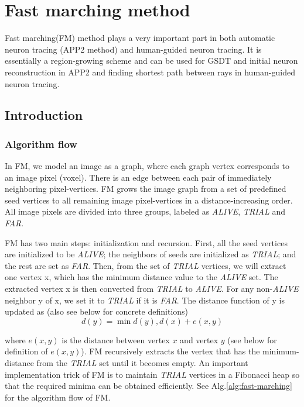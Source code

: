 \chapter{Fast marching method} \label{chpt:fm}
Fast marching(FM) method \cite{sethian1999level} plays a very important part in both automatic neuron tracing (APP2 method) and human-guided neuron tracing. It is essentially a region-growing scheme and can be used for GSDT and initial neuron reconstruction in APP2 and finding shortest path between rays in human-guided neuron tracing.
\section{Introduction}
\subsection{Algorithm flow}
In FM, we model an image as a graph, where each graph vertex corresponds to an image pixel (voxel). There is an edge between each pair of immediately neighboring pixel-vertices. FM grows the image graph from a set of predefined seed vertices to all remaining image pixel-vertices in a distance-increasing order.  All image pixels are divided into three groups, labeled as \emph{ALIVE}, \emph{TRIAL} and \emph{FAR}. 

FM has two main steps: initialization and recursion. First, all the seed vertices are initialized to be \emph{ALIVE}; the neighbors of seeds are initialized as \emph{TRIAL}; and the rest are set as \emph{FAR}. Then, from the set of \emph{TRIAL} vertices, we will extract one vertex x, which has the minimum distance value to the \emph{ALIVE} set. The extracted vertex x is then converted from \emph{TRIAL} to \emph{ALIVE}.  For any non-\emph{ALIVE} neighbor y of x, we set it to \emph{TRIAL} if it is \emph{FAR}. The distance function of y is updated as (also see below for concrete definitions)
\begin{equation}
d(y)=\min⁡{d(y),d(x)+e(x,y)}
\end{equation}

where $e(x,y)$ is the distance between vertex $x$ and vertex $y$ (see below for definition of $e(x,y)$). FM recursively extracts the vertex that has the minimum-distance from the \emph{TRIAL} set until it becomes empty.
An important implementation trick of FM is to maintain \emph{TRIAL} vertices in a Fibonacci heap so that the required minima can be obtained efficiently. See Alg.\ref{alg:fast-marching} for the algorithm flow of FM.

